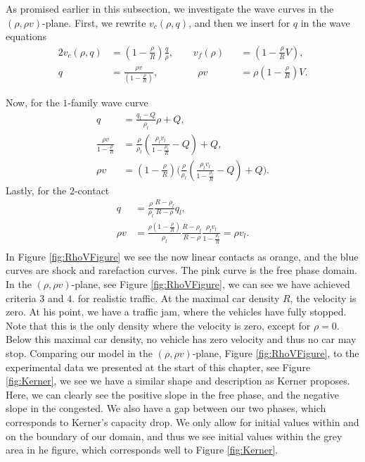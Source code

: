 \documentclass[10pt]{article}
\numberwithin{equation}{section}
\begin{document}
As promised earlier in this subsection, we investigate the wave curves in the $(\rho, \rho v)$-plane. First, we rewrite $v_c(\rho,q)$, and then we insert for $q$ in the wave equations
\begin{alignat*}{2}
    v_c(\rho,q) &= ( 1 - \frac{\rho}{R})\frac{q}{\rho},  \quad \quad v_f(\rho) &&= (1- \frac{\rho}{R}V),  \\
    q &= \frac{\rho v }{( 1 - \frac{\rho}{R})}, \quad \quad \quad\quad \rho v &&= \rho(1- \frac{\rho}{R})V .
\end{alignat*}

Now, for the $1$-family wave curve
\begin{align*}
    q &= \frac{q_l-Q}{\rho_l}\rho + Q, \\
    \frac{\rho v}{1- \frac{\rho}{R}} &= \frac{\rho}{\rho_l}( \frac{\rho_l v_l}{1- \frac{\rho_l}{R} } -Q )  + Q , \\
    \rho v &= (1 - \frac{\rho}{R}) \bigg( \frac{\rho}{\rho_l}( \frac{\rho_l v_l}{1- \frac{\rho_l}{R}} - Q) + Q \bigg). 
\end{align*}
Lastly, for the $2$-contact
\begin{align*}
    q &= \frac{\rho}{\rho_l} \frac{R - \rho_l}{R - \rho} q_l, \\ 
    \rho v &= \frac{\rho (1 - \frac{\rho}{R}) }{\rho_l} \frac{R - \rho_l}{R - \rho} \frac{\rho_l v_l}{1 - \frac{\rho_l}{R}}  = \rho v_l . \\ 
\end{align*}
In Figure \ref{fig:RhoVFigure} we see the now linear contacts as orange, and the blue curves are shock and rarefaction curves. The pink curve is the free phase domain. 
In the $(\rho , \rho v)$-plane, see Figure \ref{fig:RhoVFigure}, we can see we have achieved criteria $3$ and $4.$ for realistic traffic. At the maximal car density $R$, the velocity is zero. At his point, we have a traffic jam, where the vehicles have fully stopped. Note that this is the only density where the velocity is zero, except for $ \rho = 0$. Below this maximal car density, no vehicle has zero velocity and thus no car may stop.  
Comparing our model in the $(\rho, \rho v)$-plane, Figure \ref{fig:RhoVFigure}, to the experimental data we presented at the start of this chapter, see Figure \ref{fig:Kerner}, we see we have a similar shape and description as Kerner proposes. Here, we can clearly see the positive slope in the free phase, and the negative slope in the congested. We also have a gap between our two phases, which corresponds to Kerner's capacity drop. We only allow for initial values within and on the boundary of our domain, and thus we see initial values within the grey area in he figure, which corresponds well to Figure \ref{fig:Kerner}. 
\end{document}
